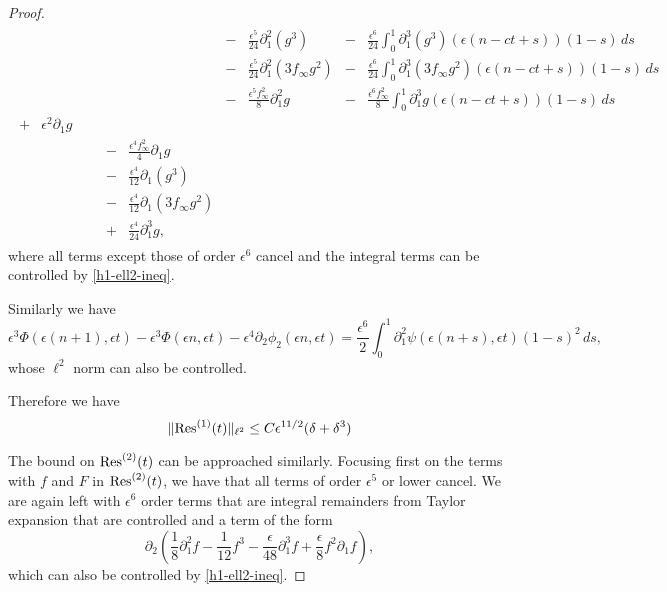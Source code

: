 \begin{proof}
\begin{equation}
\begin{aligned}
\begin{aligned}
				& & & & & & - & \frac{\epsilon^5}{24} \partial_1^2(g^3) & - & \frac{\epsilon^6}{24} \int_0^1 \partial_1^3(g^3)(\epsilon(n-ct+s))(1-s)\, ds \\
				& & & & & & - & \frac{\epsilon^5}{24} \partial_1^2(3f_\infty g^2) & - & \frac{\epsilon^6}{24} \int_0^1 \partial_1^3(3f_\infty g^2)(\epsilon(n-ct+s))(1-s)\, ds \\
				& & & & & & - & \frac{\epsilon^5 f_\infty ^2} 8 \partial_1^2 g & - & \frac{\epsilon^6f_\infty ^2}{8} \int_0^1 \partial_1^3 g(\epsilon(n-ct+s)) (1-s) \, ds \\
				+&\epsilon^2 \partial_1g \\
				& & & & - & \frac{\epsilon^4f_\infty ^2}{4} \partial_1 g \\
				& & & & - &\frac{\epsilon^4} {12}\partial_1 (g^3) \\
				& & & & - &\frac{\epsilon^4} {12}\partial_1 (3f_\infty g^2) \\ 
				& & & & + & \frac{\epsilon^4}{24} \partial_1^3 g,
			\end{aligned}
		\end{aligned}
	\end{equation}
	where all terms except those of order \(\epsilon^6\) cancel and the integral terms can be controlled by \cref{h1-ell2-ineq}. 
	\fi
	
	Similarly we have
	\begin{equation}
		\epsilon^3 \Phi(\epsilon(n+1), \epsilon t) - \epsilon^3\Phi(\epsilon n , \epsilon t) - \epsilon^4 \partial_2 \phi_2(\epsilon n, \epsilon t) =  \frac{\epsilon^6} 2 \int_0^1 \partial_1^2 \psi(\epsilon(n+s),\epsilon t)(1-s)^2\, ds,
	\end{equation}
	whose \(\ell^2\) norm can also be controlled.
	
	Therefore we have 
	\begin{equation}
		\| \mathrm{Res}^{(1)}(t) \|_{\ell^2} \leq C \epsilon^{11/2}(\delta + \delta^3)
	\end{equation}

	The bound on \(\mathrm{Res}^{(2)}(t)\) can be approached similarly. Focusing first on the terms with \(f\) and \(F\) in \(\mathrm{Res}^{(2)}(t)\), we have that all terms of order \(\epsilon^5\) or lower cancel. We are again left with \(\epsilon^6\) order terms that are integral remainders from Taylor expansion that are controlled and a term of the form 
	\begin{equation}
		\partial_2\left(\frac{1} 8 \partial_1^2 f - \frac{1}{12} f^3  - \frac{\epsilon}{48} \partial_1^3 f + \frac{\epsilon} 8 f^2 \partial_1 f\right),
	\end{equation}
  	which can also be controlled by \cref{h1-ell2-ineq}.
  	

\end{proof}

